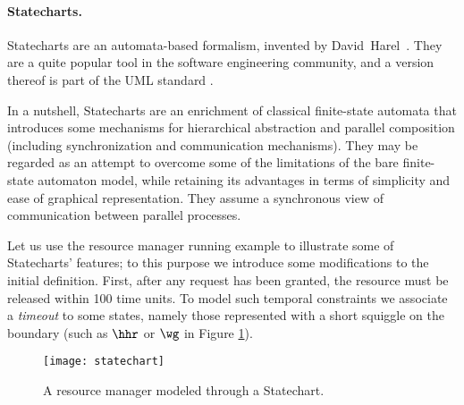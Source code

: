 \paragraph{Statecharts.}
Statecharts are an automata-based formalism, invented by \linebreak
David~Harel~\cite{Har87}. They are a quite popular tool in the
software engineering community, and a version thereof is part of the
UML standard \cite{UML05,UML04}.

In a nutshell, Statecharts are an enrichment of classical finite-state 
automata that introduces some mechanisms for hierarchical abstraction 
and parallel composition (including synchronization and communication 
mechanisms). They may be regarded as an attempt to overcome some 
of the limitations of the bare finite-state automaton model, 
while retaining its advantages in terms of simplicity and ease 
of graphical representation. They assume a synchronous view of 
communication between parallel processes.

Let us use the resource manager running example to illustrate 
some of Statecharts' features; to this purpose we introduce some 
modifications to the initial definition. First, after any request has 
been granted, the resource must be released within 100 time units. 
To model such  temporal constraints we associate a \emph{timeout} 
to some states, namely those represented with a short squiggle 
on the boundary (such as $\hhr$ or $\wg$ in Figure \ref{fig:statechart}).

\begin{figure}[htb!]
	 \centering
	 \texttt{[image: statechart]}
	 \caption{A resource manager modeled through a Statechart.}
	 \label{fig:statechart}
\end{figure}

